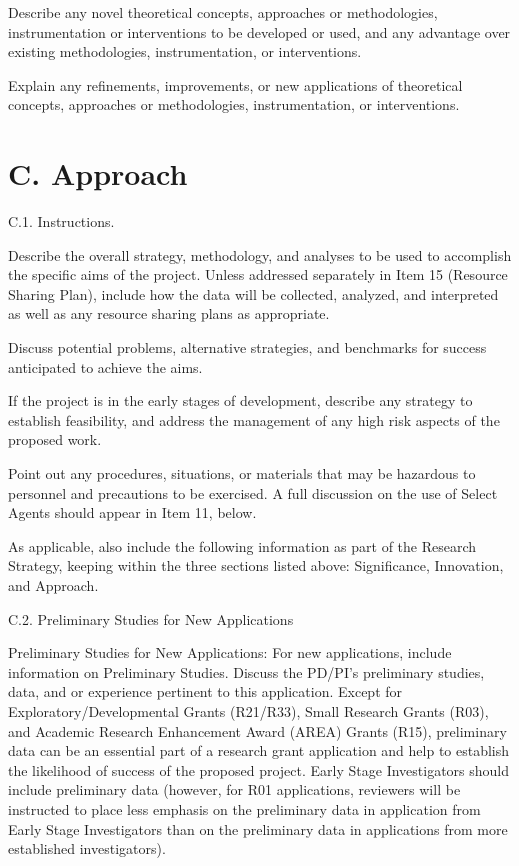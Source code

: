 \documentclass[11pt, notitlepage]{article} %
\begin{document}
Describe any novel theoretical concepts, approaches or methodologies, instrumentation or interventions to be developed or used, and any advantage over existing methodologies, instrumentation, or interventions.

Explain any refinements, improvements, or new applications of theoretical concepts, approaches or methodologies, instrumentation, or interventions.


\section*{C. Approach}

\begin{description}
	\item[C.1. Instructions.]{}
\end{description}

Describe the overall strategy, methodology, and analyses to be used to accomplish the specific aims of the project. Unless addressed separately in Item 15 (Resource Sharing Plan), include how the data will be collected, analyzed, and interpreted as well as any resource sharing plans as appropriate.

Discuss potential problems, alternative strategies, and benchmarks for success anticipated to achieve the aims.

If the project is in the early stages of development, describe any strategy to establish feasibility, and address the management of any high risk aspects of the proposed work.

Point out any procedures, situations, or materials that may be hazardous to personnel and precautions to be exercised. A full discussion on the use of Select Agents should appear in Item 11, below.

As applicable, also include the following information as part of the Research Strategy, keeping within the three sections listed above: Significance, Innovation, and Approach.

\begin{description}
	\item[C.2. Preliminary Studies for New Applications]{}
\end{description}

Preliminary Studies for New Applications: For new applications, include information on Preliminary Studies. Discuss the PD/PI's preliminary studies, data, and or experience pertinent to this application. Except for Exploratory/Developmental Grants (R21/R33), Small Research Grants (R03), and Academic Research Enhancement Award (AREA) Grants (R15), preliminary data can be an essential part of a research grant application and help to establish the likelihood of success of the proposed project. Early Stage Investigators should include preliminary data (however, for R01 applications, reviewers will be instructed to place less emphasis on the preliminary data in application from Early Stage Investigators than on the preliminary data in applications from more established investigators).
\end{document}

